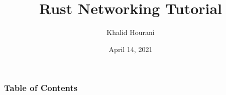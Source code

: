 \documentclass{beamer}
\title{Rust Networking Tutorial}
\author{Khalid Hourani}
\date{April 14, 2021}
\institute{University of Houston}
\begin{document}
\frame{\titlepage}

\begin{frame}
    \frametitle{Table of Contents}
    \tableofcontents
\end{frame}



\end{document}
